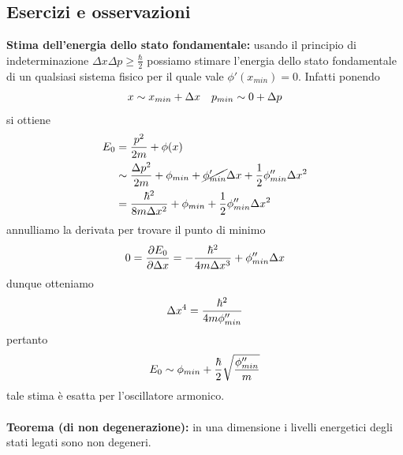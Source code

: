 \documentclass{article}
\begin{document}
\subsection{Esercizi e osservazioni}
\textbf{Stima dell'energia dello stato fondamentale:} usando il principio di indeterminazione $\Delta x \Delta p \geq \frac{\hbar}{2}$ possiamo stimare l'energia dello stato fondamentale di un qualsiasi sistema fisico per il quale vale $\phi'(x_{min}) = 0$. Infatti ponendo
\begin{gather}
    x \sim x_{min} + \Delta x \quad p_{min} \sim 0 + \Delta p \notag
\end{gather}
si ottiene
\begin{align}
    E_0 &= \frac{p^2}{2m} + \phi(x) \notag \\
    &\sim \frac{\Delta p^2}{2m} + \phi_{min} + \cancel{\phi'_{min}}\Delta x + \frac{1}{2}\phi''_{min}\Delta x^2 \notag \\
    &= \frac{\hbar^2}{8m\Delta x^2} + \phi_{min} + \frac{1}{2}\phi''_{min}\Delta x^2 \notag
\end{align}
annulliamo la derivata per trovare il punto di minimo
\begin{align}
    0 = \frac{\partial E_0}{\partial \Delta x} = -\frac{\hbar^2}{4m\Delta x^3} + \phi''_{min}\Delta x \notag
\end{align}
dunque otteniamo
\begin{gather}
    \Delta x^4 = \frac{\hbar^2}{4m\phi''_{min} \notag}
\end{gather}
pertanto
\begin{gather}
    E_0 \sim \phi_{min} + \frac{\hbar}{2}\sqrt{\frac{\phi''_{min}}{m}} \notag
\end{gather}
tale stima è esatta per l'oscillatore armonico. \\ \\
\textbf{Teorema (di non degenerazione):} in una dimensione i livelli energetici degli stati legati sono non degeneri. \\
\end{document}
